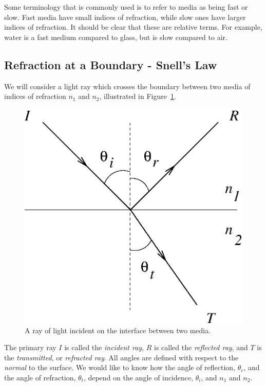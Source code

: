 Some terminology that is commonly used is to refer to media as being fast or
slow.  Fast media have small indices of refraction, while slow ones have
larger indices of refraction.  It should be clear that these are relative 
terms. For example, water is a fast medium compared to 
glass, but is slow compared to air. 


\subsection{Refraction at a Boundary - Snell's Law}

We will consider a light ray which crosses the boundary between two media of 
indices of refraction $n_1$ and $n_2$, illustrated in 
Figure~\ref{fig:opt:interface}.
\begin{figure}[htb]
\centering 
\epsfxsize=6cm \includegraphics[scale=0.6]{8_optics/interface.eps}
\caption{A ray of light incident on the interface between two media.}
\label{fig:opt:interface}
\end{figure}
The primary ray $I$ is called the {\it incident ray}, $R$ is called the 
{\it reflected ray}, and $T$ is the {\it transmitted}, or {\it refracted ray}.
All angles are defined with respect to the {\it normal} to the surface. We 
would like to know how the angle of reflection, $\theta_r$, and the angle
of refraction, $\theta_t$, depend on the angle of incidence, $\theta_i$, and
$n_1$ and $n_2$.

